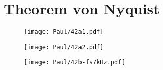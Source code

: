 \section{Theorem von Nyquist}


\begin{figure}[h]
    \centering
    \texttt{[image: Paul/42a1.pdf]}
    \caption{}
\end{figure}


\begin{figure}[h]
    \centering
    \texttt{[image: Paul/42a2.pdf]}
    \caption{}
\end{figure}

\begin{figure}[h]
    \centering
    \texttt{[image: Paul/42b-fs7kHz.pdf]}
    \caption{}
\end{figure}